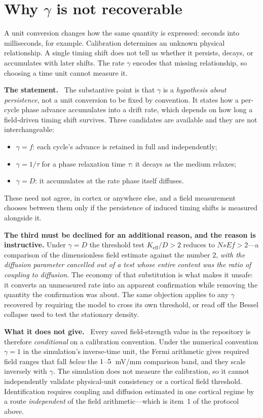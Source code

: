 \documentclass[11pt]{article}
\newcommand{\statement}{\par\smallskip\noindent\textbf{The statement.}\ }
\newcommand{\scope}{\par\smallskip\noindent\textbf{What it does not give.}\ }
\newcommand{\Keff}{K_{\mathrm{eff}}}
\begin{document}
\section{Why \texorpdfstring{$\gamma$}{gamma} is not recoverable}

A unit conversion changes how the same quantity is expressed: seconds into
milliseconds, for example. Calibration determines an unknown physical
relationship. A single timing shift does not tell us whether it persists,
decays, or accumulates with later shifts. The rate $\gamma$ encodes that
missing relationship, so choosing a time unit cannot measure it.

\statement
The substantive point is that $\gamma$ is a \emph{hypothesis about
persistence}, not a unit conversion to be fixed by convention. It states how a
per-cycle phase advance accumulates into a drift rate, which depends on how
long a field-driven timing shift survives. Three candidates are available and
they are not interchangeable:
\begin{itemize}[leftmargin=*,noitemsep]
\item $\gamma=f$: each cycle's advance is retained in full and independently;
\item $\gamma=1/\tau$ for a phase relaxation time $\tau$: it decays as the
medium relaxes;
\item $\gamma=D$: it accumulates at the rate phase itself diffuses.
\end{itemize}
These need not agree, in cortex or anywhere else, and a field measurement
chooses between them only if the persistence of induced timing shifts is
measured alongside it.

\textbf{The third must be declined for an additional reason, and the reason is
instructive.} Under $\gamma=D$ the threshold test $\Keff/D>2$ reduces to
$NsEf>2$---a comparison of the dimensionless field estimate against the number
$2$, \emph{with the diffusion parameter cancelled out of a test whose entire
content was the ratio of coupling to diffusion}. The economy of that
substitution is what makes it unsafe: it converts an unmeasured rate into an
apparent confirmation while removing the quantity the confirmation was about.
The same objection applies to any $\gamma$ recovered by requiring the model to
cross its own threshold, or read off the Bessel collapse used to test the
stationary density.

\scope
Every saved field-strength value in the repository is therefore
\emph{conditional} on a calibration convention. Under the numerical convention
$\gamma=1$ in the simulation's inverse-time unit, the Fermi arithmetic gives
required field ranges that fall \emph{below} the
$1$--$5$~mV/mm comparison band, and they scale
inversely with $\gamma$. The simulation does not measure the calibration, so it
cannot independently validate physical-unit consistency or a cortical field
threshold. Identification requires coupling and diffusion estimated in one
cortical regime by a route \emph{independent} of the field arithmetic---which is
item~1 of the protocol above.
\end{document}
